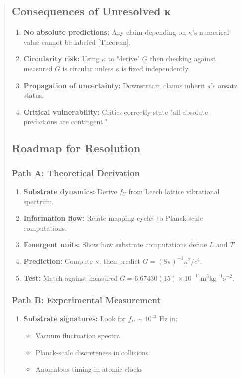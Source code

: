\documentclass[11pt,titlepage]{article}
\begin{document}
\begin{abstract}
\subsection{Consequences of Unresolved κ}

\begin{enumerate}
\item \textbf{No absolute predictions:} Any claim depending on $\kappa$'s numerical value cannot be labeled [Theorem].

\item \textbf{Circularity risk:} Using $\kappa$ to "derive" $G$ then checking against measured $G$ is circular unless $\kappa$ is fixed independently.

\item \textbf{Propagation of uncertainty:} Downstream claims inherit κ's ansatz status.

\item \textbf{Critical vulnerability:} Critics correctly state "all absolute predictions are contingent."
\end{enumerate}

\subsection{Roadmap for Resolution}

\subsubsection{Path A: Theoretical Derivation}
\begin{enumerate}
\item \textbf{Substrate dynamics:} Derive $f_U$ from Leech lattice vibrational spectrum.
\item \textbf{Information flow:} Relate mapping cycles to Planck-scale computations.
\item \textbf{Emergent units:} Show how substrate computations define $L$ and $T$.
\item \textbf{Prediction:} Compute $\kappa$, then predict $G = (8\pi)^{-1} \kappa^2 / c^4$.
\item \textbf{Test:} Match against measured $G = 6.67430(15) \times 10^{-11} \text{m}^3\text{kg}^{-1}\text{s}^{-2}$.
\end{enumerate}

\subsubsection{Path B: Experimental Measurement}
\begin{enumerate}
\item \textbf{Substrate signatures:} Look for $f_U \sim 10^{43}$ Hz in:
\begin{itemize}
\item Vacuum fluctuation spectra
\item Planck-scale discreteness in collisions
\item Anomalous timing in atomic clocks
\end{itemize}


\end{enumerate}
\end{abstract}
\end{document}
